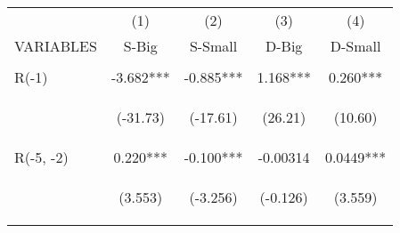 \documentclass[]{standalone}
\begin{document}
\begin{tabular}{lcccc} \hline
                     & (1)                                            & (2)                                            & (3)                                            & (4)                                            \\
    VARIABLES        & S-Big                                          & S-Small                                        & D-Big                                          & D-Small                                        \\ \hline
    \vspace{4pt}     & \begin{footnotesize}\end{footnotesize}         & \begin{footnotesize}\end{footnotesize}         & \begin{footnotesize}\end{footnotesize}         & \begin{footnotesize}\end{footnotesize}         \\
    R(-1)            & -3.682***                                      & -0.885***                                      & 1.168***                                       & 0.260***                                       \\
    \vspace{4pt}     & \begin{footnotesize}(-31.73)\end{footnotesize} & \begin{footnotesize}(-17.61)\end{footnotesize} & \begin{footnotesize}(26.21)\end{footnotesize}  & \begin{footnotesize}(10.60)\end{footnotesize}  \\
    R(-5, -2)        & 0.220***                                       & -0.100***                                      & -0.00314                                       & 0.0449***                                      \\
    \vspace{4pt}     & \begin{footnotesize}(3.553)\end{footnotesize}  & \begin{footnotesize}(-3.256)\end{footnotesize} & \begin{footnotesize}(-0.126)\end{footnotesize} & \begin{footnotesize}(3.559)\end{footnotesize}  \\

\end{tabular}
\end{document}
